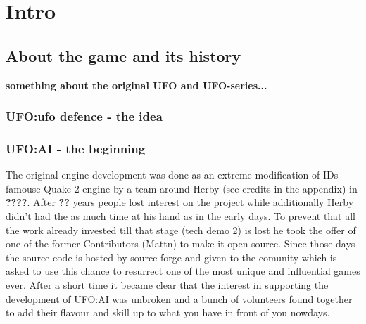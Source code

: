 
\chapter{Intro}
\section{About the game and its history}

\textbf{something about the original UFO and UFO-series...}


\subsection{UFO:ufo defence - the idea}

\subsection{UFO:AI - the beginning}
The original engine development was done as an extreme modification of IDs famouse Quake 2 engine by a team around Herby (see credits in the appendix) in \textbf{????}. After \textbf{??} years people lost interest on the project while additionally Herby didn't had the as much time at his hand as in the early days.
To prevent that all the work already invested till that stage (tech demo 2) is lost he took the offer of one of the former Contributors (Mattn) to make it open source.  Since those days the source code is hosted by source forge and given to the comunity which is asked to use this chance to resurrect one of the most unique and influential games ever. After a short time it became clear that the interest in supporting the development of UFO:AI was unbroken and a bunch of volunteers found together to add their flavour and skill up to what you have in front of you nowdays.

